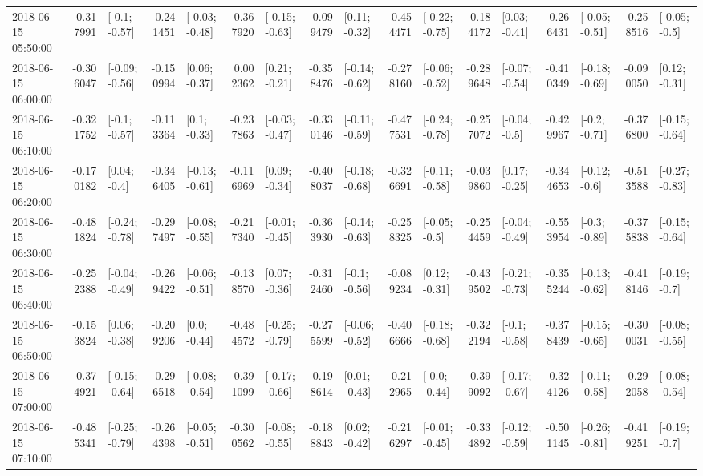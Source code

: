 \begin{tabular}{lrlrlrlrlrlrlrlrl}
2018-06-15 05:50:00 & -0.317991 &   [-0.1; -0.57] & -0.241451 &  [-0.03; -0.48] & -0.367920 &  [-0.15; -0.63] & -0.099479 &   [0.11; -0.32] & -0.454471 &  [-0.22; -0.75] & -0.184172 &   [0.03; -0.41] & -0.266431 &  [-0.05; -0.51] & -0.258516 &   [-0.05; -0.5] \\
2018-06-15 06:00:00 & -0.306047 &  [-0.09; -0.56] & -0.150994 &   [0.06; -0.37] &  0.002362 &   [0.21; -0.21] & -0.358476 &  [-0.14; -0.62] & -0.278160 &  [-0.06; -0.52] & -0.289648 &  [-0.07; -0.54] & -0.410349 &  [-0.18; -0.69] & -0.090050 &   [0.12; -0.31] \\
2018-06-15 06:10:00 & -0.321752 &   [-0.1; -0.57] & -0.113364 &    [0.1; -0.33] & -0.237863 &  [-0.03; -0.47] & -0.330146 &  [-0.11; -0.59] & -0.477531 &  [-0.24; -0.78] & -0.257072 &   [-0.04; -0.5] & -0.429967 &   [-0.2; -0.71] & -0.376800 &  [-0.15; -0.64] \\
2018-06-15 06:20:00 & -0.170182 &    [0.04; -0.4] & -0.346405 &  [-0.13; -0.61] & -0.116969 &   [0.09; -0.34] & -0.408037 &  [-0.18; -0.68] & -0.326691 &  [-0.11; -0.58] & -0.039860 &   [0.17; -0.25] & -0.344653 &   [-0.12; -0.6] & -0.513588 &  [-0.27; -0.83] \\
2018-06-15 06:30:00 & -0.481824 &  [-0.24; -0.78] & -0.297497 &  [-0.08; -0.55] & -0.217340 &  [-0.01; -0.45] & -0.363930 &  [-0.14; -0.63] & -0.258325 &   [-0.05; -0.5] & -0.254459 &  [-0.04; -0.49] & -0.553954 &   [-0.3; -0.89] & -0.375838 &  [-0.15; -0.64] \\
2018-06-15 06:40:00 & -0.252388 &  [-0.04; -0.49] & -0.269422 &  [-0.06; -0.51] & -0.138570 &   [0.07; -0.36] & -0.312460 &   [-0.1; -0.56] & -0.089234 &   [0.12; -0.31] & -0.439502 &  [-0.21; -0.73] & -0.355244 &  [-0.13; -0.62] & -0.418146 &   [-0.19; -0.7] \\
2018-06-15 06:50:00 & -0.153824 &   [0.06; -0.38] & -0.209206 &    [0.0; -0.44] & -0.484572 &  [-0.25; -0.79] & -0.275599 &  [-0.06; -0.52] & -0.406666 &  [-0.18; -0.68] & -0.322194 &   [-0.1; -0.58] & -0.378439 &  [-0.15; -0.65] & -0.300031 &  [-0.08; -0.55] \\
2018-06-15 07:00:00 & -0.374921 &  [-0.15; -0.64] & -0.296518 &  [-0.08; -0.54] & -0.391099 &  [-0.17; -0.66] & -0.198614 &   [0.01; -0.43] & -0.212965 &   [-0.0; -0.44] & -0.399092 &  [-0.17; -0.67] & -0.324126 &  [-0.11; -0.58] & -0.292058 &  [-0.08; -0.54] \\
2018-06-15 07:10:00 & -0.485341 &  [-0.25; -0.79] & -0.264398 &  [-0.05; -0.51] & -0.300562 &  [-0.08; -0.55] & -0.188843 &   [0.02; -0.42] & -0.216297 &  [-0.01; -0.45] & -0.334892 &  [-0.12; -0.59] & -0.501145 &  [-0.26; -0.81] & -0.419251 &   [-0.19; -0.7] \\

\end{tabular}
